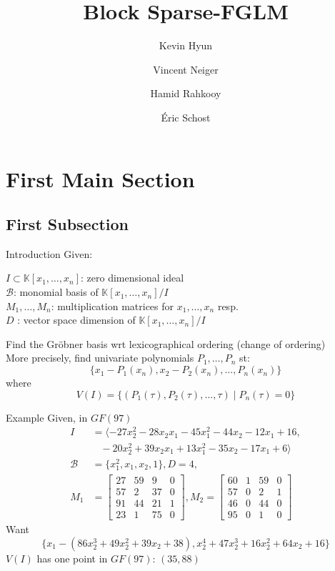 \documentclass{beamer}
\title{Block Sparse-FGLM}
\author{Kevin Hyun \and Vincent Neiger \and Hamid Rahkooy \and \'Eric Schost}
\begin{document}
\begin{frame}
  \titlepage
\end{frame}


\section{First Main Section}

\subsection{First Subsection}

\begin{frame}{Introduction}
	Given:
	\begin{center}
		$I \subset \mathbb{K}[x_1,\dots,x_n]$: zero dimensional ideal\\
		$\mathcal{B}$: monomial basis of $\mathbb{K}[x_1,\dots,x_n]/I$\\
		$M_1,\dots,M_n$: multiplication matrices for $x_1,\dots,x_n$ resp.\\
		$D$ : vector space dimension of $\mathbb{K}[x_1,\dots,x_n]/I$
	\end{center}
	Find the Gr\"obner basis wrt lexicographical ordering
	(change of ordering)\\
	\pause
	More precisely, find univariate polynomials $P_1,\dots, P_n$ st:
	$$ \{ x_1- P_1(x_n), x_2-P_2(x_n), \dots, P_n(x_n) \}$$
	where
	$$ V(I) = \{  (P_1(\tau), P_2(\tau), \dots, \tau) \mid P_n(\tau) = 0   \}$$
\end{frame}

\begin{frame}{Example}
	Given, in $GF(97)$
	\begin{align*}
	I &= \langle -27x_2^2 - 28x_2x_1 - 45x_1^2 - 44x_2 - 12x_1 + 16, \\
	&\;\;\; -20x_2^2 + 39x_2x_1 + 13x_1^2 - 35x_2 - 17x_1 + 6\rangle\\
	\mathcal{B} &= \{ x_1^2,x_1,x_2,1 \}, D = 4, \\
	M_1 &= \begin{bmatrix}
	27& 59&  9&  0\\
	57&  2& 37&  0\\
	91& 44& 21&  1\\
	23&  1& 75&  0
	\end{bmatrix},
	M_2 = \begin{bmatrix}
	60&  1& 59&  0\\
	57&  0&  2&  1\\
	46&  0& 44&  0\\
	95&  0&  1&  0
	\end{bmatrix}
	\end{align*}
	Want
	$$ \{
	x_1 -(86x_2^3 + 49x_2^2 + 39x_2 + 38) ,x_2^4 + 47x_2^3 + 16x_2^2 + 64x_2 + 16\}$$
	$V(I)$ has one point in $GF(97)$: $(35,88)$
\end{frame}
\end{document}
